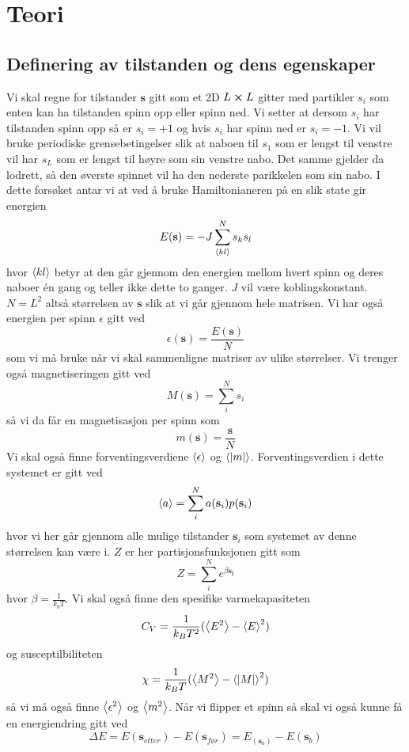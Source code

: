 \documentclass[reprint,english,notitlepage]{revtex4-2}  %
\begin{document}
\section{Teori}
\subsection{Definering av tilstanden og dens egenskaper}
Vi skal regne for tilstander $\mathbf{s}$ gitt som et 2D $L\cross L$ gitter med partikler $s_i$ som enten kan ha tilstanden spinn opp eller spinn ned. Vi setter at dersom $s_i$ har tilstanden spinn opp så er $s_i=+1$ og hvis $s_i$ har spinn ned er $s_i=-1$. Vi vil bruke periodiske grensebetingelser slik at naboen til $s_1$ som er lengst til venstre vil har $s_L$ som er lengst til høyre som sin venstre nabo. Det samme gjelder da lodrett, så den øverste spinnet vil ha den nederste parikkelen som sin nabo. I dette forsøket antar vi at ved å bruke Hamiltonianeren på en slik state gir energien
$$
E(\mathbf{s})=-J\sum_{\expval{kl}}^{N} s_k s_l
$$
hvor $\expval{kl}$ betyr at den går gjennom den energien mellom hvert spinn og deres naboer én gang og teller ikke dette to ganger. $J$ vil være koblingskonstant. $N=L^2$ altså størrelsen av $\mathbf{s}$ slik at vi går gjennom hele matrisen.
\newline Vi har også energien per spinn $\epsilon$ gitt ved 
$$
\epsilon(\mathbf{s}) =\frac{E(\mathbf{s})}{N}
$$
som vi må bruke når vi skal sammenligne matriser av ulike størrelser.
\newline Vi trenger også magnetiseringen gitt ved
$$
M(\mathbf{s})=\sum_i^N s_i
$$
så vi da får en magnetisasjon per spinn som
$$
m(\mathbf{s})=\frac{\mathbf{s}}{N}
$$
Vi skal også finne forventingsverdiene $\expval{\epsilon}$ og $\expval{|m|}$. Forventingsverdien i dette systemet er gitt ved
$$
\expval{a}=\sum _i^{N}a(\mathbf{s}_i) p(\mathbf{s}_i)
$$
hvor vi her går gjennom alle mulige tilstander $\mathbf{s}_i$ som systemet av denne størrelsen kan være i. $Z$ er her partisjonsfunksjonen gitt som
$$
Z=\sum_{i}^{N}e^{\beta \mathbf{s_i}}
$$
hvor $\beta=\frac{1}{k_bT}$. \newline  Vi skal også finne den spesifike varmekapasiteten
$$
C_V=\frac{1}{k_B T^2}(\expval{E^2}-\expval{E}^2)
$$
og susceptilbiliteten
$$
\chi =\frac{1}{k_B T}(\expval{M^2}-\expval{|M|}^2)
$$
så vi må også finne $\expval{\epsilon^2}$ og $\expval{m^2}$. \newline
Når vi flipper et spinn så skal vi også kunne få en energiendring gitt ved
$$
\Delta E=E(\mathbf{s}_{etter})-E(\mathbf{s}_{før})=E_(\mathbf{s}_a)-E(\mathbf{s}_b)
$$
\end{document}
